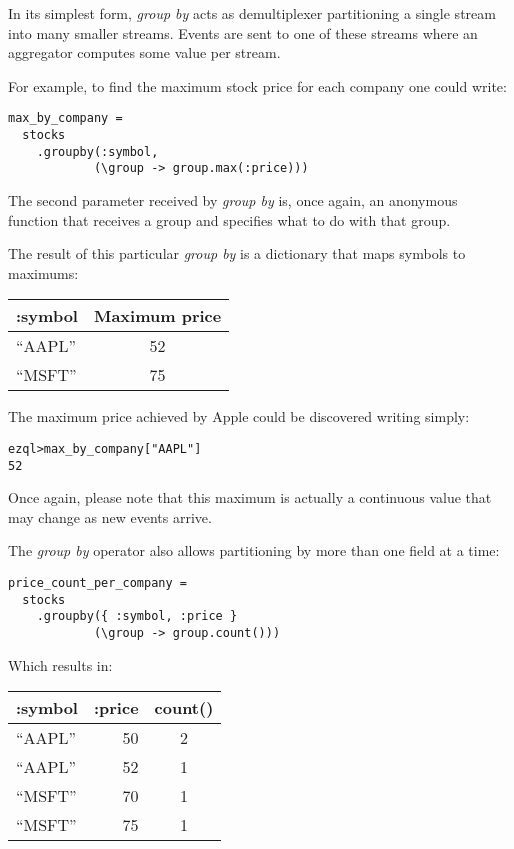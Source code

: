 \documentclass{report}
\newenvironment{evaluation}
{
  \framed
  \begin{alltt}
}
{
  \end{alltt}
  \endframed
}
\begin{document}
In its simplest form, \emph{group by} acts as demultiplexer
partitioning a single stream into many smaller streams. Events are
sent to one of these streams where an aggregator computes some value
per stream.

For example, to find the maximum stock price for each company one
could write:

\begin{verbatim}
max_by_company =
  stocks
    .groupby(:symbol,
            (\group -> group.max(:price)))
\end{verbatim}

The second parameter received by \emph{group by} is, once again, an
anonymous function that receives a group and specifies what to do with
that group.

The result of this particular \emph{group by} is a dictionary that
maps symbols to maximums:

\begin{tabular}{ |l|c| }
  \hline
  :symbol & Maximum price \\
  \hline
  ``AAPL'' & 52 \\
  ``MSFT'' & 75 \\
  \hline
\end{tabular}

The maximum price achieved by Apple could be discovered writing
simply:

\begin{evaluation}
ezql> max_by_company["AAPL"]
52
\end{evaluation}

Once again, please note that this maximum is actually a continuous
value that may change as new events arrive.

The \emph{group by} operator also allows partitioning by more than one
field at a time:

\begin{verbatim}
price_count_per_company =
  stocks
    .groupby({ :symbol, :price }
            (\group -> group.count()))
\end{verbatim}

Which results in:

\begin{tabular}{ |l|r|c| }
  \hline
  :symbol & :price & count() \\
  \hline
  ``AAPL'' & 50 & 2 \\
  ``AAPL'' & 52 & 1 \\
  ``MSFT'' & 70 & 1 \\
  ``MSFT'' & 75 & 1 \\
  \hline
\end{tabular}
\end{document}
